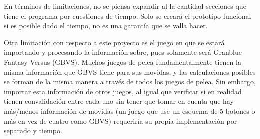 En términos de limitaciones, no se piensa expandir al la cantidad secciones que tiene el programa por cuestiones de tiempo. Solo se creará el prototipo funcional si es posible dado el tiempo, no es una garantía que se valla hacer.

Otra limitación con respecto a este proyecto es el juego en que se estará importando y procesando la información sobre, pues solamente será Granblue Fantasy Versus (GBVS). Muchos juegos de pelea fundamentalmente tienen la misma información que GBVS tiene para sus movidas, y las calculaciones posibles se forman de la misma manera a través de todos los juegos de pelea. Sin embargo, importar esta información de otros juegos, al igual que verificar si en realidad tienen convalidación entre cada uno sin tener que tomar en cuenta que hay más/menos información de movidas (un juego que use un esquema de 5 botones o más en vez de cuatro como GBVS) requeriría su propia implementación por separado y tiempo. 
